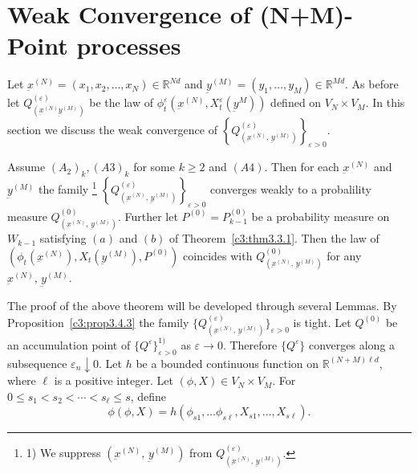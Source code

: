\section{Weak Convergence of (N+M)-Point processes}\label{chap3:sec3.5}%

Let $\underbar{x}^{(N)} = (x_1, x_2, \ldots,x_N) \in
\mathbb{R}^{Nd}$ and $\underbar{y}^{(M)}= (y_1, \ldots, y_M)
\in \mathbb{R}^{Md}$. As before let $
Q^{(\varepsilon)}_{(\underbar{x}^{(N)} \underbar{y}^{(M)})}$ be the law
of $\phi^{\varepsilon}_t (\underbar{x}^{(N)}, X^{\varepsilon}_t
(\underbar{y}^{M}))$ defined on $V_N \times V_M$. In this section we
discuss the weak convergence of $ \left\{
Q^{(\varepsilon)}_{(\underbar{x}^{(N)}, \,  \underbar{y}^{(M)})}
\right\}_{\varepsilon > 0}$. 


\begin{theorem}\label{c3:thm3.5.1}\pageoriginale%
  Assume $(A_2)_k,(A3)_k$ for some $k \geq 2$ and $(A4)$. Then for
  each $\underbar{x}^{(N)}$ and $\underbar{y}^{(M)}$ the
  family \footnote{1) We suppress
    $(\underbar{x}^{(N)}, \, \underbar{y}^{(M)})$
    from $Q^{(\varepsilon)}_{(\underbar{x}^{(N)}, \,  \underbar{y}^{(M)})}
    $.} $\left\{ Q^{(\varepsilon)}_{(\underbar{x}^{(N)}, \,  \underbar{y}^{(M)})}
  \right\}_{\varepsilon > 0}$ converges weakly to a probalility measure
  $Q^{(0)}_{(\underbar{x}^{(N)}, \,
    \underbar{y}^{(M)})}$. Further let $P^{(0)}= P^{(0)}_{k-1}$ be a
  probability measure on $W_{k-1}$ satisfying $(a)$ and $(b)$ of
  Theorem~\ref{c3:thm3.3.1}. Then the law of $(\phi_t
  (\underbar{x}^{(N)}), X_t(\underbar{y}^{(M)}),  P^{(0)})$ coincides
  with $Q^{(0)}_{(\underbar{x}^{(N)}, \,  \underbar{y}^{(M)})}$ for
  any $\underbar{x}^{(N)}, \, \underbar{y}^{(M)}$.  
\end{theorem}

The proof of the above theorem will be developed through several
Lemmas. By Proposition~\ref{c3:prop3.4.3} the family $ \{
Q^{(\varepsilon)}_{(\underbar{x}^{(N)}, \,  \underbar{y}^{(M)})}
\}_{\varepsilon > 0}$ is tight. Let $Q^{(0)}$ be an accumulation point
of $\{ Q^{\varepsilon} \}^{1)}_{\varepsilon > 0}$ as $\varepsilon \to
0$. Therefore $\{ Q^{\varepsilon} \}$ converges along a subsequence
$\varepsilon_n \downarrow 0$. Let $h$ be a bounded continuous function
on $\mathbb{R}^{(N+M) \ell d}$, where $\ell$ is a positive
integer. Let $(\phi,X) \in V_N \times V_M$. For $0 \leq s_1 <
s_2 < \cdots <s_{\ell} \leq s$, define  
\begin{equation*}
  \phi(\phi,X) = h(\phi_{s1}, \ldots \phi_{s \ell}, X_{s1}, \ldots,
  X_{s \ell}). \tag{3.5.1}\label{c3:eq3.5.1} 
\end{equation*}


